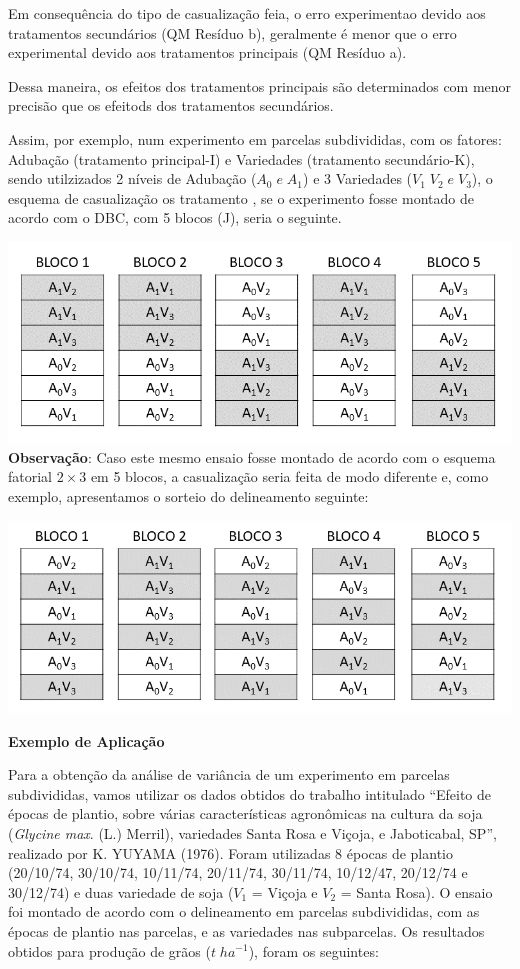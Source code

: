 \documentclass[
]{book}
\begin{document}
Em consequência do tipo de casualização feia, o erro experimentao devido aos tratamentos secundários (QM Resíduo b), geralmente é menor que o erro experimental devido aos tratamentos principais (QM Resíduo a).

Dessa maneira, os efeitos dos tratamentos principais são determinados com menor precisão que os efeitods dos tratamentos secundários.

Assim, por exemplo, num experimento em parcelas subdivididas, com os fatores: Adubação (tratamento principal-I) e Variedades (tratamento secundário-K), sendo utilzizados 2 níveis de Adubação (\(A_0\; e\; A_1\)) e 3 Variedades (\(V_1\;V_2\;e\; V_3\)), o esquema de casualização os tratamento , se o experimento fosse montado de acordo com o DBC, com 5 blocos (J), seria o seguinte.

\includegraphics{psub1.png}
\textbf{Observação}: Caso este mesmo ensaio fosse montado de acordo com o esquema fatorial \(2 \times 3\) em 5 blocos, a casualização seria feita de modo diferente e, como exemplo, apresentamos o sorteio do delineamento seguinte:

\includegraphics{fat1.png}

\textbf{Exemplo de Aplicação}

Para a obtenção da análise de variância de um experimento em parcelas subdivididas, vamos utilizar os dados obtidos do trabalho intitulado ``Efeito de épocas de plantio, sobre várias características agronômicas na cultura da soja (\emph{Glycine max}. (L.) Merril), variedades Santa Rosa e Viçoja, e Jaboticabal, SP'', realizado por K. YUYAMA (1976). Foram utilizadas 8 épocas de plantio (20/10/74, 30/10/74, 10/11/74, 20/11/74, 30/11/74, 10/12/47, 20/12/74 e 30/12/74) e duas variedade de soja (\(V_1\) = Viçoja e \(V_2\) = Santa Rosa). O ensaio foi montado de acordo com o delineamento em parcelas subdivididas, com as épocas de plantio nas parcelas, e as variedades nas subparcelas. Os resultados obtidos para produção de grãos (\(t\;ha^{-1}\)), foram os seguintes:
\end{document}
